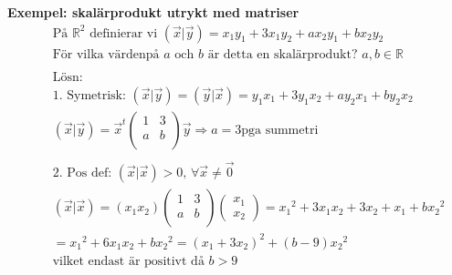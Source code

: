 \textbf{Exempel: skalärprodukt utrykt med matriser}
\begin{align*}
  &\quad  \text{På $\mathbb{R}^2$ definierar vi } (\vec{x}|\vec{y}) = x_1y_1 + 3x_1y_2 + ax_2y_1 + bx_2y_2 \\
  &\quad  \text{För vilka värdenpå $a$ och $b$ är detta en skalärprodukt? } a,b \in \mathbb{R} \\
  &\quad  \\
  &\quad  \text{Lösn: } \\
  &\quad  \text{1. Symetrisk:  }  (\vec{x}|\vec{y}) = (\vec{y}|\vec{x}) = y_1x_1 + 3y_1x_2 + ay_2x_1 + by_2x_2 \\
  &\quad  (\vec{x}|\vec{y}) =
  \vec{x}^t
  \left(\begin{array}{cc}
    1 & 3 \\
    a & b \\
  \end{array}\right)
  \vec{y} \Rightarrow{a=3} \text{pga summetri} \\
  &\quad  \\
  &\quad  \text{2. Pos def:  }  (\vec{x}|\vec{x}) > 0, \, \forall{} \vec{x} \neq{\vec{0}}  \\
  &\quad  (\vec{x}|\vec{x}) = (x_1 x_2)
  \left(\begin{array}{cc}
    1 & 3 \\
    a & b \\
  \end{array}\right) \begin{pmatrix} x_1 \\ x_2 \end{pmatrix} = {x_1}^2 + 3x_1x_2 + 3x_2+x_1 + b{x_2}^2 \\
  &\quad  = {x_1}^2 + 6x_1x_2 + b{x_2}^2 = {(x_1+3x_2)}^2 + (b-9){x_2}^2 \\
  &\quad  \text{vilket endast är positivt då } b>9 \\
\end{align*}



\newpage

